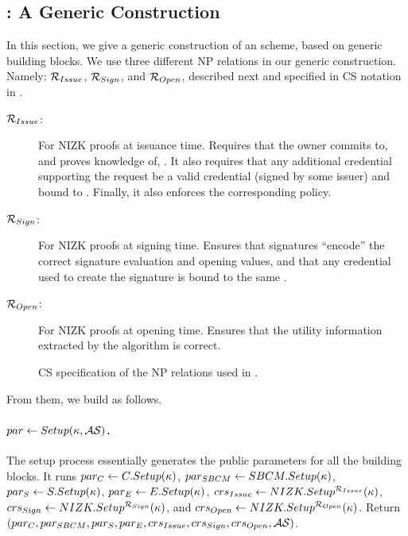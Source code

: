 \subsection{\CUASGen: A Generic \UAS Construction}
\label{ssec:generic-construction-uas}

In this section, we give a generic construction of an \UAS scheme, based on
generic building blocks. We use three different NP relations in our generic
construction. Namely: $\mathcal{R}_{Issue}$, $\mathcal{R}_{Sign}$, and
$\mathcal{R}_{Open}$, described next and specified in CS notation \needcite
in .

\begin{description}
\item[$\mathcal{R}_{Issue}$:] For NIZK proofs at issuance time. Requires that the
  owner commits to, and proves knowledge of, \usk. It also requires that any
  additional credential supporting the request be a valid credential (signed by
  some issuer) and bound to \usk. Finally, it also enforces the
  corresponding \fissue policy.
\item[$\mathcal{R}_{Sign}$:] For NIZK proofs at signing time. Ensures that
  signatures ``encode'' the correct signature evaluation and opening values, and
  that any credential used to create the signature is bound to the same \usk.
\item[$\mathcal{R}_{Open}$:] For NIZK proofs at opening time. Ensures that the
  utility information extracted by the \Open algorithm is correct.
\end{description}

\begin{figure}[ht!]
  \centering
  \scalebox{0.9}{
    
  }
  \caption{CS specification of the NP relations used in \CUASGen.
  }
  \label{fig:nizkrels}
\end{figure}

From them, we build \CUASGen as follows.

\paragraph{$par \gets Setup(\kappa,\mathcal{AS})$.} %
The setup process essentially generates the public parameters for all the
building blocks. It runs $par_C \gets C.Setup(\kappa)$, $par_{SBCM} \gets
SBCM.Setup(\kappa)$, $par_{S} \gets S.Setup(\kappa)$, $par_{E} \gets
E.Setup(\kappa)$, $crs_{Issue} \gets NIZK.Setup^{\mathcal{R}_{Issue}}
(\kappa)$, $crs_{Sign} \gets NIZK.Setup^{\mathcal{R}_{Sign}}(\kappa)$, and
$crs_{Open} \gets NIZK.Setup^{\mathcal{R}_{Open}}(\kappa)$. Return $
(par_C,par_{SBCM},par_{S},par_{E},crs_{Issue},crs_{Sign},
crs_{Open},\mathcal{AS})$. %

